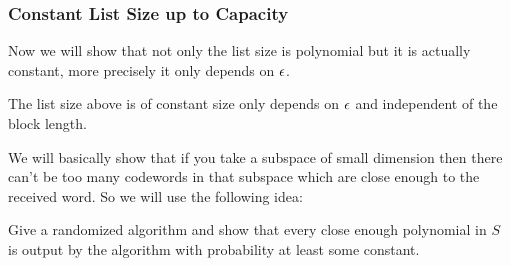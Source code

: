 \subsubsection{Constant List Size up to Capacity}
Now we will show that not only the list size is polynomial but it is actually constant, more precisely it only depends on $\epsilon$.
\begin{Theorem}{\cite{KoppartyRonZewiSarafWootters_2018_IDo_CONF}}{}
The list size above is of constant size only depends on $\epsilon$ and independent of the block length.
\end{Theorem}
We will basically show that if you take a subspace of small dimension then there can't be too many codewords in that subspace which are close enough to the received word. So we will use the following idea:
\begin{idea*}
Give a randomized algorithm and show that every close enough polynomial in $S$ is output by the algorithm with probability at least some constant.
\end{idea*}
